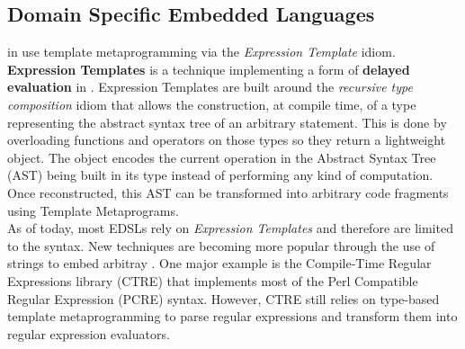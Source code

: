 \documentclass[../main]{subfiles}
\begin{document}
%



\subsection{
  \cpp Domain Specific Embedded Languages
}

\dsels in \cpp use template metaprogramming via the \textit{Expression
Template} idiom.
\textbf{Expression Templates} \cite{veldhuizen:1995,vandevoorde:2002} is a
technique implementing a
form of \textbf{delayed evaluation} in \cpp \cite{spinellis:2001}. Expression
Templates are built around the \textit{recursive type composition}
idiom \cite{jarvi:1998} that allows the construction, at compile time, of a type
representing the abstract syntax tree of an arbitrary statement. This is done by
overloading functions and operators on those types so they return a lightweight
object. The object encodes the current operation in the Abstract Syntax Tree
(AST) being built in its type instead of performing any kind of computation. Once
reconstructed, this AST can be transformed into arbitrary code fragments using
Template Metaprograms.
\\

As of today, most \cpp EDSLs rely on \textit{Expression Templates} and therefore
are limited to the \cpp syntax. New techniques are becoming more popular through
the use of \constexpr strings to embed arbitray \dsels. One major example is
the Compile-Time Regular Expressions library (CTRE) \cite{ctre} that implements
most of the Perl Compatible Regular Expression (PCRE) syntax. However, CTRE
still relies on type-based template metaprogramming to parse regular expressions
and transform them into regular expression evaluators.


\end{document}
